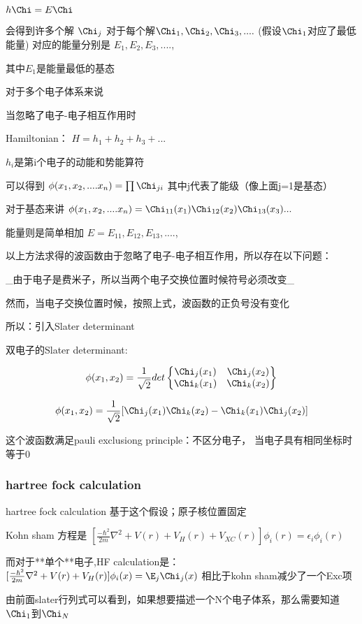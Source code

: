 \documentclass{article}
\begin{document}
$h\Chi=E\Chi$

会得到许多个解 $\Chi_j$
对于每个解$\Chi_1,\Chi_2,\Chi_3,....$
(假设$\Chi_1$对应了最低能量)
对应的能量分别是 $E_1,E_2,E_3,....$,

其中$E_1$是能量最低的基态

对于多个电子体系来说

当忽略了电子-电子相互作用时

Hamiltonian： $H=h_1+h_2+h_3+...$

$h_i$是第i个电子的动能和势能算符

可以得到
$\phi(x_1,x_2,....x_n)=\prod{\Chi_{ji}}$
其中j代表了能级（像上面j=1是基态）

对于基态来讲
$\phi(x_1,x_2,....x_n)=\Chi_{11}(x_1)\Chi_{12}(x_2)\Chi_{13}(x_3)...$

能量则是简单相加
$E=E_{11},E_{12},E_{13},....$,

以上方法求得的波函数由于忽略了电子-电子相互作用，所以存在以下问题：

_由于电子是费米子，所以当两个电子交换位置时候符号必须改变_

然而，当电子交换位置时候，按照上式，波函数的正负号没有变化

所以：引入Slater determinant

双电子的Slater determinant:

$$\phi(x_1,x_2)=\frac{1}{\sqrt2}det\left\{\begin{matrix}
\Chi_j(x_1)&\Chi_j(x_2)\\
\Chi_k(x_1)&\Chi_k(x_2)\\
\end{matrix}\right\}$$

$$\phi(x_1,x_2)=\frac{1}{\sqrt2}[\Chi_j(x_1)\Chi_k(x_2)-\Chi_k(x_1)\Chi_j(x_2)]$$

这个波函数满足pauli exclusiong principle：不区分电子， 当电子具有相同坐标时等于0

\subsubsection {hartree fock calculation }

hartree fock calculation 基于这个假设；原子核位置固定


Kohn sham 方程是
$[\frac{-\hbar^2}{2m}\nabla^2+V(r)+V_H(r)+V_{XC}(r)]\phi_i(r)=\epsilon_i\phi_i(r)$

而对于**单个**电子,HF calculation是： 
$[\frac{-\hbar^2}{2m}\nabla^2+V(r)+V_H(r)]\phi_i(x)=\E_j\Chi_j(x)$
相比于kohn sham减少了一个Exc项

由前面slater行列式可以看到，如果想要描述一个N个电子体系，那么需要知道$\Chi_1$到$\Chi_N$
\end{document}
